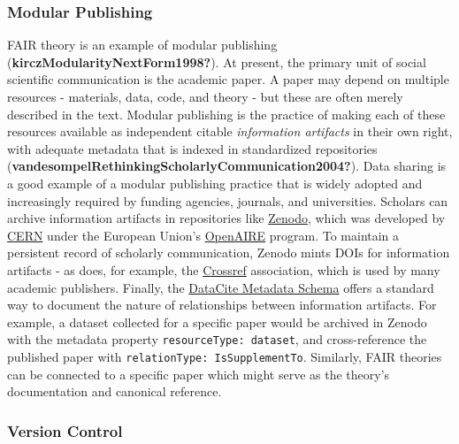 \documentclass[
  man,floatsintext]{apa6}
\begin{document}
\subsubsection{Modular Publishing}\label{modular-publishing}

FAIR theory is an example of modular publishing (\textbf{kirczModularityNextForm1998?}).
At present, the primary unit of social scientific communication is the academic paper.
A paper may depend on multiple resources - materials, data, code, and theory - but these are often merely described in the text.
Modular publishing is the practice of making each of these resources available as independent citable \emph{information artifacts} in their own right,
with adequate metadata that is indexed in standardized repositories (\textbf{vandesompelRethinkingScholarlyCommunication2004?}).
Data sharing is a good example of a modular publishing practice that is widely adopted and increasingly required by funding agencies, journals, and universities.
Scholars can archive information artifacts in repositories like \href{https://zenodo.org/}{Zenodo},
which was developed by \href{https://home.cern/}{CERN} under the European Union's \href{https://www.openaire.eu/}{OpenAIRE} program.
To maintain a persistent record of scholarly communication,
Zenodo mints DOIs for information artifacts - as does, for example, the \href{https://www.crossref.org/}{Crossref} association,
which is used by many academic publishers.
Finally, the \href{}{DataCite Metadata Schema} offers a standard way to document the nature of relationships between information artifacts.
For example, a dataset collected for a specific paper would be archived in Zenodo with the metadata property \texttt{resourceType:\ dataset},
and cross-reference the published paper with \texttt{relationType:\ IsSupplementTo}.
Similarly, FAIR theories can be connected to a specific paper which might serve as the theory's documentation and canonical reference.

\subsubsection{Version Control}\label{version-control}
\end{document}
